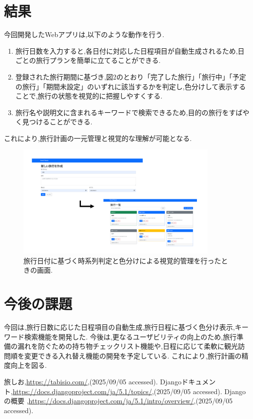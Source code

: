 \documentclass[a4j,twocolumn]{jsarticle}
\begin{document}
\section{結果}
\label{sec:org56d57ea}
今回開発したWebアプリは,以下のような動作を行う.

\begin{enumerate}
\item 旅行日数を入力すると,各日付に対応した日程項目が自動生成されるため,日ごとの旅行プランを簡単に立てることができる.
\item 登録された旅行期間に基づき,図2のとおり「完了した旅行」「旅行中」「予定の旅行」「期間未設定」のいずれに該当するかを判定し,色分けして表示することで,旅行の状態を視覚的に把握しやすくする.
\item 旅行名や説明文に含まれるキーワードで検索できるため,目的の旅行をすばやく見つけることができる.
\end{enumerate}
これにより,旅行計画の一元管理と視覚的な理解が可能となる.

\begin{figure}[htbp]
\centering
\includegraphics[width=10cm]{./figs/trip1.png}
\caption{\label{fig:orge3687c8}旅行日付に基づく時系列判定と色分けによる視覚的管理を行ったときの画面.}
\end{figure}


\section{今後の課題}
\label{sec:org4842f37}
今回は,旅行日数に応じた日程項目の自動生成,旅行日程に基づく色分け表示,キーワード検索機能を開発した.
今後は,更なるユーザビリティの向上のため,旅行準備の漏れを防ぐための持ち物チェックリスト機能や,日程に応じて柔軟に観光訪問順を変更できる入れ替え機能の開発を予定している.
これにより,旅行計画の精度向上を図る.


\small\setlength\baselineskip{10pt}
\begin{thebibliography}{9}

 旅しお,\url{https://tabisio.com/},(2025/09/05 accessed).
Djangoドキュメント,\url{https://docs.djangoproject.com/ja/5.1/topics/},(2025/09/05 accessed).
Djangoの概要 ,\url{https://docs.djangoproject.com/ja/5.1/intro/overview/},(2025/09/05 accessed).
\end{thebibliography}
\end{document}
